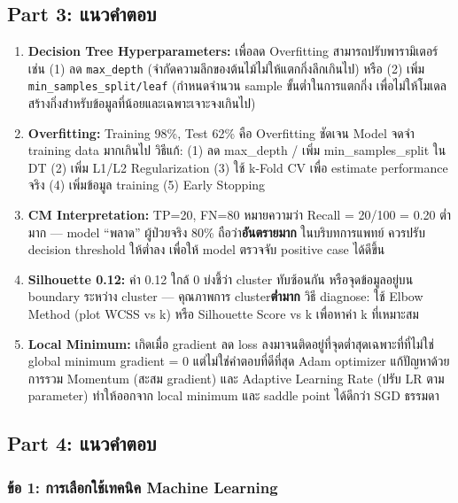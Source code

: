 \documentclass[a4paper,12pt]{article}
\begin{document}
\subsection*{Part 3: แนวคำตอบ}

\begin{enumerate}[label=\textbf{\arabic*.}]
    \item \textbf{Decision Tree Hyperparameters:} เพื่อลด Overfitting สามารถปรับพารามิเตอร์เช่น (1) ลด \texttt{max\_depth} (จำกัดความลึกของต้นไม้ไม่ให้แตกกิ่งลึกเกินไป) หรือ (2) เพิ่ม \texttt{min\_samples\_split/leaf} (กำหนดจำนวน sample ขั้นต่ำในการแตกกิ่ง เพื่อไม่ให้โมเดลสร้างกิ่งสำหรับข้อมูลที่น้อยและเฉพาะเจาะจงเกินไป)

    \item \textbf{Overfitting:} Training 98\%, Test 62\% คือ Overfitting ชัดเจน Model จดจำ training data มากเกินไป วิธีแก้: (1) ลด max\_depth / เพิ่ม min\_samples\_split ใน DT (2) เพิ่ม L1/L2 Regularization (3) ใช้ k-Fold CV เพื่อ estimate performance จริง (4) เพิ่มข้อมูล training (5) Early Stopping

    \item \textbf{CM Interpretation:} TP=20, FN=80 หมายความว่า Recall = 20/100 = 0.20 ต่ำมาก --- model ``พลาด'' ผู้ป่วยจริง 80\% ถือว่า\textbf{อันตรายมาก} ในบริบทการแพทย์ ควรปรับ decision threshold ให้ต่ำลง  เพื่อให้ model ตรวจจับ positive case ได้ดีขึ้น

    \item \textbf{Silhouette 0.12:} ค่า 0.12 ใกล้ 0 บ่งชี้ว่า cluster ทับซ้อนกัน หรือจุดข้อมูลอยู่บน boundary ระหว่าง cluster --- คุณภาพการ cluster\textbf{ต่ำมาก} วิธี diagnose: ใช้ Elbow Method (plot WCSS vs k) หรือ Silhouette Score vs k เพื่อหาค่า k ที่เหมาะสม

    \item \textbf{Local Minimum:} เกิดเมื่อ gradient ลด loss ลงมาจนติดอยู่ที่จุดต่ำสุดเฉพาะที่ที่ไม่ใช่ global minimum gradient = 0 แต่ไม่ใช่คำตอบที่ดีที่สุด Adam optimizer แก้ปัญหาด้วยการรวม Momentum (สะสม gradient) และ Adaptive Learning Rate (ปรับ LR ตาม parameter) ทำให้ออกจาก local minimum และ saddle point ได้ดีกว่า SGD ธรรมดา
\end{enumerate}

\newpage
\subsection*{Part 4: แนวคำตอบ}

\subsubsection*{ข้อ 1: การเลือกใช้เทคนิค Machine Learning}
\end{document}
